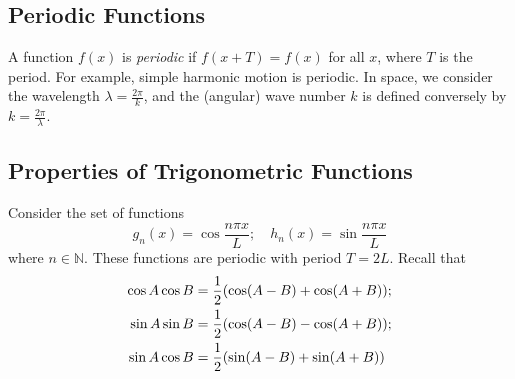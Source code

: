 \subsection{Periodic Functions}
A function \( f(x) \) is \textit{periodic} if \( f(x+T) = f(x) \) for all \( x \), where \( T \) is the period.
For example, simple harmonic motion is periodic.
In space, we consider the wavelength \( \lambda = \frac{2\pi}{k} \), and the (angular) wave number \( k \) is defined conversely by \( k = \frac{2\pi}{\lambda} \).

\subsection{Properties of Trigonometric Functions}
Consider the set of functions
\[
	g_n(x) = \cos \frac{n\pi x}{L};\quad h_n(x) = \sin \frac{n\pi x}{L}
\]
where \( n \in \mathbb N \).
These functions are periodic with period \( T = 2L \).
Recall that
\begin{align*}
	\cos A \cos B & = \frac{1}{2}\qty(\cos(A-B) + \cos(A+B)); \\
	\sin A \sin B & = \frac{1}{2}\qty(\cos(A-B) - \cos(A+B)); \\
	\sin A \cos B & = \frac{1}{2}\qty(\sin(A-B) + \sin(A+B))
\end{align*}

